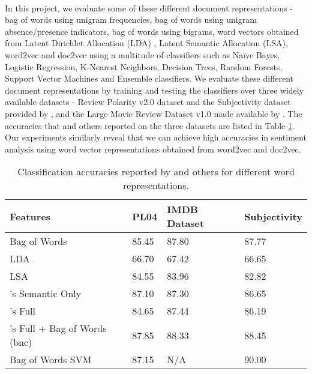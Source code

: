 \documentclass[a4paper,26pt]{article}
\begin{document}
\paragraph{}
In this project, we evaluate some of these different document representations - bag of words using unigram frequencies, bag of words using unigram absence/presence indicators, bag of words using bigrams, word vectors obtained from Latent Dirichlet Allocation (LDA) \cite{blei2003latent}, Latent Semantic Allocation (LSA), word2vec \cite{le2014distributed} and doc2vec using a multitude of classifiers such as Na\"{i}ve Bayes, Logistic Regression, K-Nearest Neighbors, Decision Trees, Random Forests, Support Vector Machines and Ensemble classifiers. We evaluate these different document representations by training and testing the classifiers over three widely available datasets - Review Polarity v2.0 dataset and the Subjectivity dataset provided by \cite{pang2004sentimental}, and the Large Movie Review Dataset v1.0 made available by \cite{maas2011learning}. The accuracies that \cite{maas2011learning} and others \cite{sadeghianbag} reported on the three datasets are listed in Table \ref{table:1}. Our experiments similarly reveal that we can achieve high accuracies in sentiment analysis using word vector representations obtained from word2vec and doc2vec. 

\begin{table}[H]
\centering
\begin{tabular}{ | l | p{1.5cm} | p{2.5cm} | p{2.5cm} |  }
 \hline
 \textbf{Features} & \textbf{PL04} & \textbf{IMDB Dataset} & \textbf{Subjectivity} \\
 \hline
 Bag of Words   & 85.45 & 87.80 & 87.77 \\

 LDA & 66.70 & 67.42 & 66.65 \\

 LSA & 84.55 & 83.96 & 82.82 \\
 \cite{maas2011learning}'s Semantic Only & 87.10 & 87.30 & 86.65 \\

 \cite{maas2011learning}'s Full & 84.65 & 87.44 & 86.19 \\

 \cite{maas2011learning}'s Full + Bag of Words (bnc) & 87.85 & 88.33 & 88.45 \\
 Bag of Words SVM \cite{pang2004sentimental} & 87.15 & N/A & 90.00 \\
 \hline
\end{tabular}
\caption{Classification accuracies reported by \cite{maas2011learning} and others for different word representations.}
\label{table:1}
\end{table}
\end{document}
